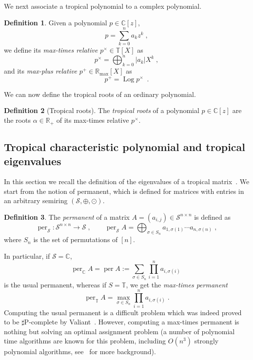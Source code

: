 \documentclass[a4paper]{amsart}
\theoremstyle{definition}
\newtheorem{defn}{Definition}
\theoremstyle{plain}
\theoremstyle{remark}
\begin{document}
We next associate a tropical polynomial to a complex polynomial.
\begin{defn}
 Given a polynomial $p \in {\mathbb{C}}[z]$,
\[
 p = \sum_{k=0}^{n} a_k z^k \;  ,
\]
we define its \emph{max-times relative} $p^{\times} \in {{\mathbb{T}}} [X]$ as
\[
 p^{\times} = \bigoplus_{k=0}^n |a_k| X^k \;  ,
\]
and its \emph{max-plus relative} $p^+ \in {{\mathbb{R}_{\max}}} [X]$ as
\[ p^+=\operatorname{Log} p^\times
\enspace .
\]
\end{defn}

We can now define the tropical roots of an ordinary polynomial.

\begin{defn}[Tropical roots]
 The \emph{tropical roots} of a polynomial $p \in {\mathbb{C}}[z]$ are the roots $\alpha \in {\mathbb{R}}_+$ of its max-times relative $p^{\times}$.
\end{defn}

\subsection{Tropical characteristic polynomial and tropical eigenvalues}
In this section we 
recall the definition
of the eigenvalues of a tropical matrix~\cite{abg04,abg04b}.
We start from the notion of permanent,
which is defined for matrices with entries
in an arbitrary semiring $( {\mathcal{S}}, \oplus, \odot )$.
\begin{defn}
	The \emph{permanent} of a matrix $A = (a_{i,j})
\in {\mathcal{S}}^{n \times n}$ is defined as
	\[ 
	\operatorname{per}_{\mathcal{S}} \colon {\mathcal{S}}^{n \times n} \to {\mathcal{S}} \;, \qquad
	\operatorname{per}_{\mathcal{S}} A = \bigoplus_{\sigma \in S_n} 
a_{1,\sigma(1)}\cdots a_{n,\sigma(n)}\;,	\]
where $S_n$ is the set of permutations of $[n]$.
\end{defn}
In particular, if ${\mathcal{S}}= {\mathbb{C}}$, 
	\[
	\operatorname{per}_{\mathbb{C}} A = \operatorname{per} A:= \sum_{\sigma \in S_n} \prod_{i = 1}^n a_{i,\sigma(i)}\; 
	\]
is the usual permanent, whereas if $S={{\mathbb{T}}}$, 
we get
the {\em max-times permanent}
	\[ \operatorname{per}_{{\mathbb{T}}} A = \max_{\sigma \in S_n} \prod_{i = 1}^{n} a_{i, \sigma(i)} \; . \]
Computing the usual permanent is a difficult problem
which was indeed proved to be $\sharp$P-complete by Valiant~\cite{valiant}.
However, computing a max-times permanent
is nothing but solving 
an optimal assignment problem (a number of
polynomial time algorithms are known for this problem,
including $O(n^3)$ strongly polynomial algorithms,
see~\cite{burkard} for more background).
\end{document}
